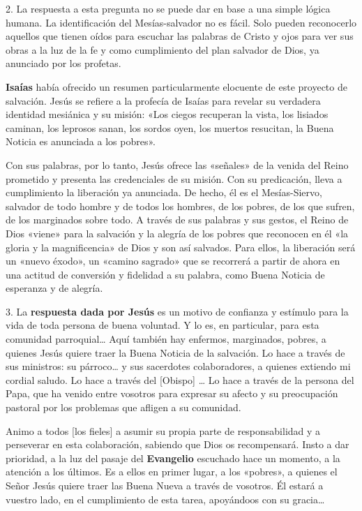 \documentclass[]{article}
\begin{document}
2. La respuesta a esta pregunta no se puede dar en base a una simple
lógica humana. La identificación del Mesías-salvador no es fácil. Solo
pueden reconocerlo aquellos que tienen oídos para escuchar las palabras
de Cristo y ojos para ver sus obras a la luz de la fe y como
cumplimiento del plan salvador de Dios, ya anunciado por los profetas.

\textbf{Isaías} había ofrecido un resumen particularmente elocuente de
este proyecto de salvación. Jesús se refiere a la profecía de Isaías
para revelar su verdadera identidad mesiánica y su misión: «Los ciegos
recuperan la vista, los lisiados caminan, los leprosos sanan, los sordos
oyen, los muertos resucitan, la Buena Noticia es anunciada a los
pobres».

Con sus palabras, por lo tanto, Jesús ofrece las «señales» de la venida
del Reino prometido y presenta las credenciales de su misión. Con su
predicación, lleva a cumplimiento la liberación ya anunciada. De hecho,
él es el Mesías-Siervo, salvador de todo hombre y de todos los hombres,
de los pobres, de los que sufren, de los marginados sobre todo. A través
de sus palabras y sus gestos, el Reino de Dios «viene» para la salvación
y la alegría de los pobres que reconocen en él «la gloria y la
magnificencia» de Dios y son así salvados. Para ellos, la liberación
será un «nuevo éxodo», un «camino sagrado» que se recorrerá a partir de
ahora en una actitud de conversión y fidelidad a su palabra, como Buena
Noticia de esperanza y de alegría.

3. La \textbf{respuesta dada por Jesús} es un motivo de confianza y
estímulo para la vida de toda persona de buena voluntad. Y lo es, en
particular, para esta comunidad parroquial\ldots{} Aquí también hay
enfermos, marginados, pobres, a quienes Jesús quiere traer la Buena
Noticia de la salvación. Lo hace a través de sus ministros: su
párroco\ldots{} y sus sacerdotes colaboradores, a quienes extiendo mi
cordial saludo. Lo hace a través del {[}Obispo{]} \ldots{} Lo hace a
través de la persona del Papa, que ha venido entre vosotros para
expresar su afecto y su preocupación pastoral por los problemas que
afligen a su comunidad.

Animo a todos {[}los fieles{]} a asumir su propia parte de
responsabilidad y a perseverar en esta colaboración, sabiendo que Dios
os recompensará. Insto a dar prioridad, a la luz del pasaje del
\textbf{Evangelio} escuchado hace un momento, a la atención a los
últimos. Es a ellos en primer lugar, a los «pobres», a quienes el Señor
Jesús quiere traer las Buena Nueva a través de vosotros. Él estará a
vuestro lado, en el cumplimiento de esta tarea, apoyándoos con su
gracia\ldots{}
\end{document}
